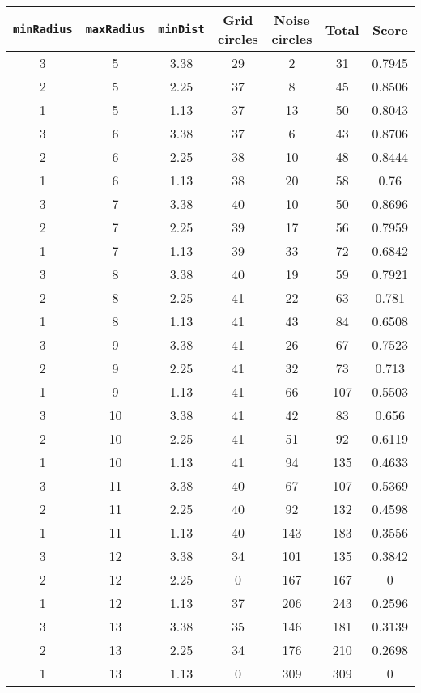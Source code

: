 \documentclass[letterpaper, 12pt]{article}
\begin{document}
\begin{longtable}{|c|c|c|c|c|c|c|}
\hline
\textbf{\texttt{minRadius}} & \textbf{\texttt{maxRadius}} & \textbf{\texttt{minDist}} & \textbf{Grid circles} & \textbf{Noise circles} & \textbf{Total} & \textbf{Score} \\
\hline
3 & 5 & 3.38 & 29 & 2 & 31 & 0.7945 \\
\hline
2 & 5 & 2.25 & 37 & 8 & 45 & 0.8506 \\
\hline
1 & 5 & 1.13 & 37 & 13 & 50 & 0.8043 \\
\hline
3 & 6 & 3.38 & 37 & 6 & 43 & 0.8706 \\
\hline
2 & 6 & 2.25 & 38 & 10 & 48 & 0.8444 \\
\hline
1 & 6 & 1.13 & 38 & 20 & 58 & 0.76 \\
\hline
3 & 7 & 3.38 & 40 & 10 & 50 & 0.8696 \\
\hline
2 & 7 & 2.25 & 39 & 17 & 56 & 0.7959 \\
\hline
1 & 7 & 1.13 & 39 & 33 & 72 & 0.6842 \\
\hline
3 & 8 & 3.38 & 40 & 19 & 59 & 0.7921 \\
\hline
2 & 8 & 2.25 & 41 & 22 & 63 & 0.781 \\
\hline
1 & 8 & 1.13 & 41 & 43 & 84 & 0.6508 \\
\hline
3 & 9 & 3.38 & 41 & 26 & 67 & 0.7523 \\
\hline
2 & 9 & 2.25 & 41 & 32 & 73 & 0.713 \\
\hline
1 & 9 & 1.13 & 41 & 66 & 107 & 0.5503 \\
\hline
3 & 10 & 3.38 & 41 & 42 & 83 & 0.656 \\
\hline
2 & 10 & 2.25 & 41 & 51 & 92 & 0.6119 \\
\hline
1 & 10 & 1.13 & 41 & 94 & 135 & 0.4633 \\
\hline
3 & 11 & 3.38 & 40 & 67 & 107 & 0.5369 \\
\hline
2 & 11 & 2.25 & 40 & 92 & 132 & 0.4598 \\
\hline
1 & 11 & 1.13 & 40 & 143 & 183 & 0.3556 \\
\hline
3 & 12 & 3.38 & 34 & 101 & 135 & 0.3842 \\
\hline
2 & 12 & 2.25 & 0 & 167 & 167 & 0 \\
\hline
1 & 12 & 1.13 & 37 & 206 & 243 & 0.2596 \\
\hline
3 & 13 & 3.38 & 35 & 146 & 181 & 0.3139 \\
\hline
2 & 13 & 2.25 & 34 & 176 & 210 & 0.2698 \\
\hline
1 & 13 & 1.13 & 0 & 309 & 309 & 0 \\

\end{longtable}
\end{document}
